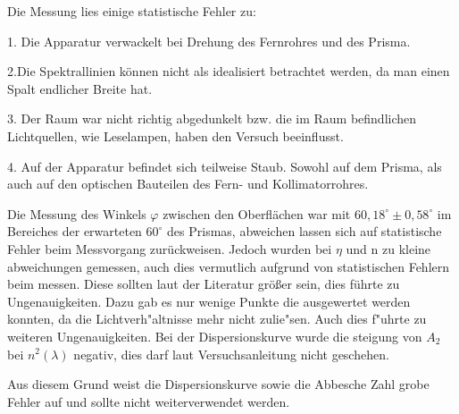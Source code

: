 %
%
Die Messung lies einige statistische Fehler zu:

1. Die Apparatur verwackelt bei Drehung des Fernrohres und des Prisma.

2.Die Spektrallinien können nicht als idealisiert betrachtet werden, da man einen Spalt
endlicher Breite hat.

3. Der Raum war nicht richtig abgedunkelt bzw. die im Raum befindlichen Lichtquellen,
wie Leselampen, haben den Versuch beeinflusst.

4. Auf der Apparatur befindet sich teilweise Staub. Sowohl auf dem Prisma, als auch auf
den optischen Bauteilen des Fern- und Kollimatorrohres.

Die Messung des Winkels $\varphi$ zwischen den Oberflächen war mit $60,18^\circ \pm 0,58^\circ$ im Bereiches der erwarteten $60^\circ$ des Prismas, abweichen lassen sich auf statistische Fehler beim Messvorgang zurückweisen.
Jedoch wurden bei $\eta$ und n zu kleine abweichungen gemessen, auch dies vermutlich aufgrund von statistischen Fehlern beim messen. Diese sollten laut der Literatur größer sein, dies führte zu Ungenauigkeiten. Dazu gab es nur wenige Punkte die ausgewertet werden konnten, da die Lichtverh"altnisse mehr nicht zulie"sen. Auch dies f"uhrte zu weiteren Ungenauigkeiten. Bei der Dispersionskurve wurde die steigung von $A_2$ bei $n^2(\lambda)$ negativ, dies darf laut Versuchsanleitung nicht geschehen.

Aus diesem Grund weist die Dispersionskurve sowie die Abbesche Zahl grobe Fehler auf und sollte nicht weiterverwendet werden.